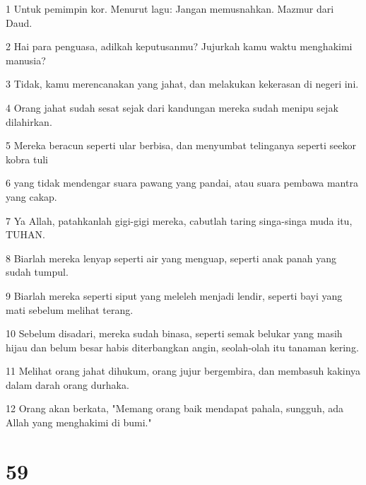 \par 1 Untuk pemimpin kor. Menurut lagu: Jangan memusnahkan. Mazmur dari Daud.
\par 2 Hai para penguasa, adilkah keputusanmu? Jujurkah kamu waktu menghakimi manusia?
\par 3 Tidak, kamu merencanakan yang jahat, dan melakukan kekerasan di negeri ini.
\par 4 Orang jahat sudah sesat sejak dari kandungan mereka sudah menipu sejak dilahirkan.
\par 5 Mereka beracun seperti ular berbisa, dan menyumbat telinganya seperti seekor kobra tuli
\par 6 yang tidak mendengar suara pawang yang pandai, atau suara pembawa mantra yang cakap.
\par 7 Ya Allah, patahkanlah gigi-gigi mereka, cabutlah taring singa-singa muda itu, TUHAN.
\par 8 Biarlah mereka lenyap seperti air yang menguap, seperti anak panah yang sudah tumpul.
\par 9 Biarlah mereka seperti siput yang meleleh menjadi lendir, seperti bayi yang mati sebelum melihat terang.
\par 10 Sebelum disadari, mereka sudah binasa, seperti semak belukar yang masih hijau dan belum besar habis diterbangkan angin, seolah-olah itu tanaman kering.
\par 11 Melihat orang jahat dihukum, orang jujur bergembira, dan membasuh kakinya dalam darah orang durhaka.
\par 12 Orang akan berkata, "Memang orang baik mendapat pahala, sungguh, ada Allah yang menghakimi di bumi."

\chapter{59}


